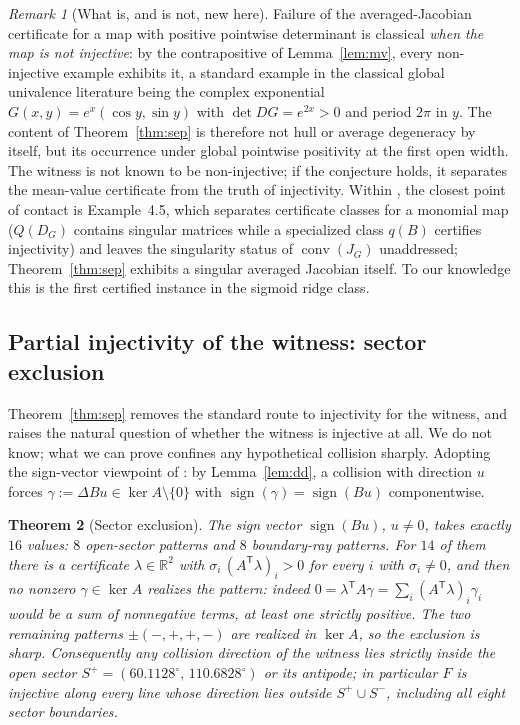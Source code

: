 \documentclass[11pt]{article}
\newtheorem{theorem}{Theorem}[section]
\theoremstyle{definition}
\theoremstyle{remark}
\newtheorem{remark}[theorem]{Remark}
\newcommand{\R}{\mathbb{R}}
\newcommand{\sgn}{\operatorname{sign}}
\begin{document}
\begin{remark}[What is, and is not, new here]\label{rem:fmr45}
Failure of the averaged-Jacobian certificate for a map with positive
pointwise determinant is classical \emph{when the map is not injective}:
by the contrapositive of Lemma~\ref{lem:mv}, every non-injective example
exhibits it, a standard example in the classical global univalence
literature \cite{galenikaido,parthasarathy} being the complex exponential
$G(x,y)=e^{x}(\cos y,\sin y)$ with $\det DG=e^{2x}>0$ and period
$2\pi$ in $y$. The content of Theorem~\ref{thm:sep} is therefore not hull or average
degeneracy by itself, but its occurrence under global pointwise positivity
at the first open width. The witness is not known to be non-injective; if
the conjecture holds, it separates the mean-value certificate from the
truth of injectivity. Within \cite{fmr}, the closest point of
contact is Example~4.5, which separates certificate classes for a
monomial map ($Q(D_G)$ contains singular matrices while a specialized
class $q(B)$ certifies injectivity) and leaves the singularity status of
$\operatorname{conv}(J_G)$ unaddressed; Theorem~\ref{thm:sep} exhibits a
singular averaged Jacobian itself. To our knowledge this is the first
certified instance in the sigmoid ridge class.
\end{remark}

\subsection{Partial injectivity of the witness: sector exclusion}

Theorem~\ref{thm:sep} removes the standard route to injectivity for the
witness, and raises the natural question of whether the witness is
injective at all. We do not know; what we can prove confines any
hypothetical collision sharply. Adopting the sign-vector viewpoint of
\cite{mhr}: by Lemma~\ref{lem:dd}, a collision with direction $u$ forces
$\gamma:=\Delta Bu\in\ker A\setminus\{0\}$ with
$\sgn(\gamma)=\sgn(Bu)$ componentwise.

\begin{theorem}[Sector exclusion]\label{thm:sector}
The sign vector $\sgn(Bu)$, $u\ne0$, takes exactly $16$ values: $8$
open-sector patterns and $8$ boundary-ray patterns. For $14$ of them
there is a certificate $\lambda\in\R^2$ with
$\sigma_i\,(A^{\mathsf T}\lambda)_i>0$ for every $i$ with $\sigma_i\ne0$,
and then no nonzero $\gamma\in\ker A$ realizes the pattern: indeed
$0=\lambda^{\mathsf T}A\gamma=\sum_i(A^{\mathsf T}\lambda)_i\gamma_i$
would be a sum of nonnegative terms, at least one strictly positive. The
two remaining patterns $\pm(-,+,+,-)$ are realized in $\ker A$, so the
exclusion is sharp. Consequently any collision direction of the witness
lies strictly inside the open sector
$S^{+}=(60.1128^\circ,\,110.6828^\circ)$ or its antipode; in particular
$F$ is injective along every line whose direction lies outside
$S^{+}\cup S^{-}$, including all eight sector boundaries.
\end{theorem}
\end{document}
